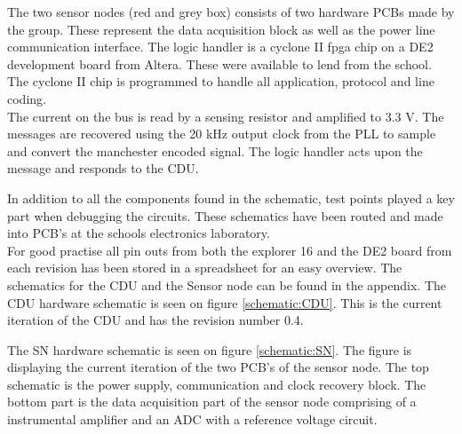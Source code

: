 The two sensor nodes (red and grey box) consists of two hardware PCBs made by the group. These represent the data acquisition block as well as the power line communication interface. The logic handler is a cyclone II fpga chip on a DE2 development board from Altera. These were available to lend from the school. The cyclone II chip is programmed to handle all application, protocol and line coding.\\
The current on the bus is read by a sensing resistor and amplified to 3.3 V. The messages are recovered using the 20 kHz output clock from the PLL to sample and convert the manchester encoded signal. The logic handler acts upon the message and responds to the CDU.

In addition to all the components found in the schematic, test points played a key part when debugging the circuits. These schematics have been routed and made into PCB's at the schools electronics laboratory.\\
For good practise all pin outs from both the explorer 16 and the DE2 board from each revision has been stored in a spreadsheet for an easy overview.
The schematics for the CDU and the Sensor node can be found in the appendix.
The CDU hardware schematic is seen on figure \ref{schematic:CDU}. This is the current iteration of the CDU and has the revision number 0.4.

The SN hardware schematic is seen on figure \ref{schematic:SN}. The figure is displaying the current iteration of the two PCB's of the sensor node. The top schematic is the power supply, communication and clock recovery block. The bottom part is the data acquisition part of the sensor node comprising of a instrumental amplifier and an ADC with a reference voltage circuit.


